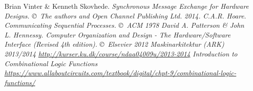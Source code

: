 \begin{thebibliography}{9}
     Brian Vinter \& Kenneth Skovhede. \it{Synchronous Message
        Exchange for Hardware Designs}. \copyright\ The authors and Open
        Channel Publishing Ltd. 2014.
     C.A.R. Hoare. \it{Communicating Sequential Processes}.
        \copyright\ ACM 1978
     David A. Patterson \& John L. Hennessy. \it{Computer
        Organization and Design - The Hardware/Software Interface (Revised 4th
        edition)}.  \copyright\ Elsevier 2012
     Maskinarkitektur (ARK) 2013/2014
        \url{http://kurser.ku.dk/course/ndaa04009u/2013-2014}
     Introduction to Combinational Logic Functions
        \url{https://www.allaboutcircuits.com/textbook/digital/chpt-9/combinational-logic-functions/}
\end{thebibliography}

